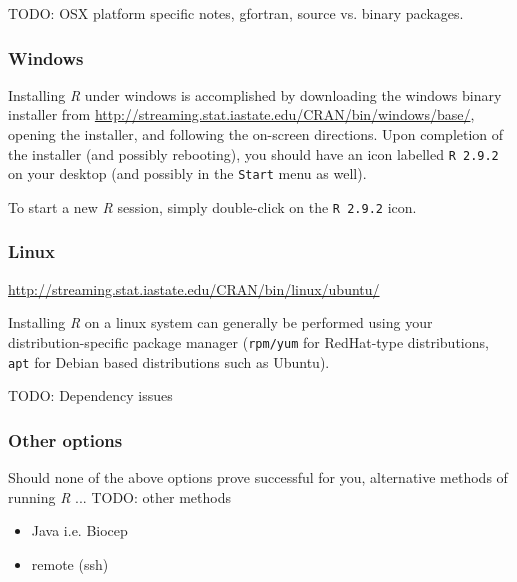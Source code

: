 \documentclass[10pt,letterpaper]{article}
\begin{document}
TODO: OSX platform specific notes, gfortran, source vs. binary packages. %


\subsubsection{Windows} %
\label{ssub:windows}

Installing \emph{R} under windows is accomplished by downloading the windows binary installer from \url{http://streaming.stat.iastate.edu/CRAN/bin/windows/base/}, opening the installer, and following the on-screen directions.  Upon completion of the installer (and possibly rebooting), you should have an icon labelled \texttt{R 2.9.2} on your desktop (and possibly in the \texttt{Start} menu as well).

To start a new \emph{R} session, simply double-click on the \texttt{R 2.9.2} icon.

\subsubsection{Linux} %
\label{ssub:linux}

\url{http://streaming.stat.iastate.edu/CRAN/bin/linux/ubuntu/}


Installing \emph{R} on a linux system can generally be performed using your distribution-specific package manager (\texttt{rpm/yum} for RedHat-type distributions, \texttt{apt} for Debian based distributions such as Ubuntu).  

TODO: Dependency issues


\subsubsection{Other options} %
\label{ssub:other_options}

Should none of the above options prove successful for you, alternative methods of running \emph{R} ... TODO: other methods

\begin{itemize}
    \item Java i.e. Biocep
    \item remote (ssh)
\end{itemize}
\end{document}
